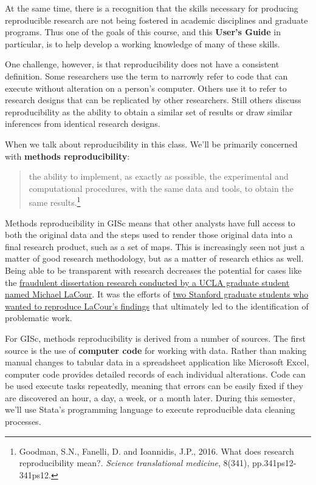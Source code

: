 \documentclass[]{book}
\let\rmarkdownfootnote\footnote%
\def\footnote{\protect\rmarkdownfootnote}
\theoremstyle{definition}
\theoremstyle{definition}
\theoremstyle{remark}
\begin{document}
At the same time, there is a recognition that the skills necessary for
producing reproducible research are not being fostered in academic
disciplines and graduate programs. Thus one of the goals of this course,
and this \textbf{User's Guide} in particular, is to help develop a
working knowledge of many of these skills.

One challenge, however, is that reproducibility does not have a
consistent definition. Some researchers use the term to narrowly refer
to code that can execute without alteration on a person's computer.
Others use it to refer to research designs that can be replicated by
other researchers. Still others discuss reproducibility as the ability
to obtain a similar set of results or draw similar inferences from
identical research designs.

When we talk about reproducibility in this class. We'll be primarily
concerned with \textbf{methods reproducibility}:

\begin{quote}
the ability to implement, as exactly as possible, the experimental and
computational procedures, with the same data and tools, to obtain the
same results.\footnote{Goodman, S.N., Fanelli, D. and Ioannidis, J.P.,
  2016. What does research reproducibility mean?. \emph{Science
  translational medicine}, 8(341), pp.341ps12-341ps12.}
\end{quote}

Methods reproducibility in GISc means that other analysts have full
access to both the original data and the steps used to render those
original data into a final research product, such as a set of maps. This
is increasingly seen not just a matter of good research methodology, but
as a matter of research ethics as well. Being able to be transparent
with research decreases the potential for cases like the
\href{http://nymag.com/scienceofus/2015/05/how-a-grad-student-uncovered-a-huge-fraud.html}{fraudulent
dissertation research conducted by a UCLA graduate student named Michael
LaCour}. It was the efforts of
\href{https://fivethirtyeight.com/features/how-two-grad-students-uncovered-michael-lacour-fraud-and-a-way-to-change-opinions-on-transgender-rights/}{two
Stanford graduate students who wanted to reproduce LaCour's findings}
that ultimately led to the identification of problematic work.

For GISc, methods reproducibility is derived from a number of sources.
The first source is the use of \textbf{computer code} for working with
data. Rather than making manual changes to tabular data in a spreadsheet
application like Microsoft Excel, computer code provides detailed
records of each individual alterations. Code can be used execute tasks
repeatedly, meaning that errors can be easily fixed if they are
discovered an hour, a day, a week, or a month later. During this
semester, we'll use Stata's programming language to execute reproducible
data cleaning processes.
\end{document}
